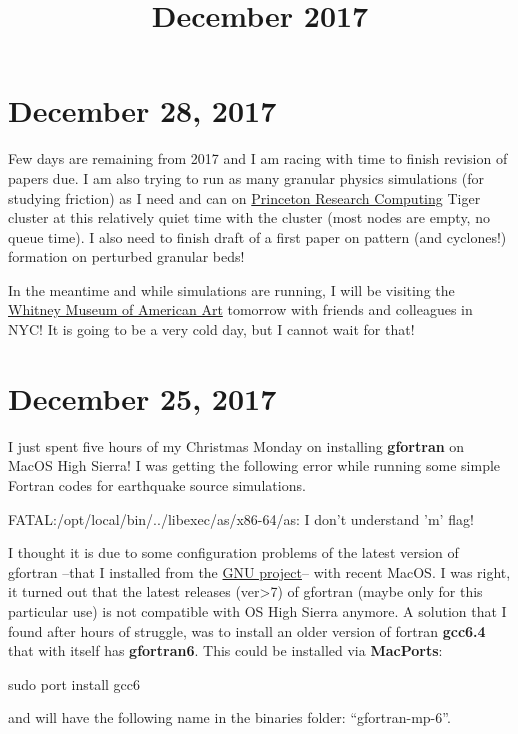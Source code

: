 \documentclass[12pt]{article}
\newenvironment{ppl}{\ttfamily}{\par}
\begin{document}

\title{December 2017}


\section*{December 28, 2017}

Few days are remaining from 2017 and I am racing with time to finish revision of papers due. I am also trying to run as many granular physics simulations (for studying friction) as I need and can on \href{https://www.princeton.edu/researchcomputing/index.xml}{Princeton Research Computing} Tiger cluster at this relatively quiet time with the cluster (most nodes are empty, no queue time). I also need to finish draft of a first paper on pattern (and cyclones!) formation on perturbed granular beds!

In the meantime and while simulations are running, I will be visiting the \href{http://whitney.org}{Whitney Museum of American Art} tomorrow with friends and colleagues in NYC! It is going to be a very cold day, but I cannot wait for that!
  


\section*{\large December 25, 2017}
\vspace{-0.1 in}

I just spent five hours of my Christmas Monday on installing {\bf gfortran} on MacOS High Sierra! I was getting the following error while running some simple Fortran codes for earthquake source simulations. 

\begin{ppl}
FATAL:/opt/local/bin/../libexec/as/x86-64/as: I don't understand 'm' flag! 
\end{ppl}

I thought it is due to some configuration problems of the latest version of gfortran --that I installed from the \href{https://gcc.gnu.org/wiki/GFortranBinariesMacOS}{GNU project}-- with recent MacOS. I was right, it turned out that the latest releases (ver>7) of gfortran (maybe only for this particular use) is not compatible with OS High Sierra anymore. A solution that I found after hours of struggle, was to install an older version of fortran {\bf gcc6.4} that with itself has {\bf gfortran6}. This could be installed via {\bf MacPorts}:

\begin{ppl}
sudo port install gcc6
\end{ppl}

and will have the following name in the binaries folder: ``gfortran-mp-6''.


%




%
%
\end{document}
